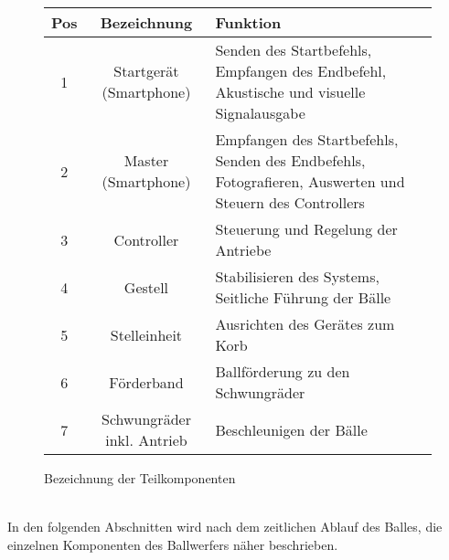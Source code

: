 \begin{figure}[h!]
	\begin{tabular}{|c|c|p{7.5cm}|}
		\hline \textbf{Pos} & \textbf{Bezeichnung} & \textbf{Funktion} \\ 
		\hline 1 & Startgerät (Smartphone) & Senden des Startbefehls, Empfangen des Endbefehl, Akustische und visuelle Signalausgabe
		\\ 
		\hline 2 & Master  (Smartphone) & Empfangen des Startbefehls, Senden des Endbefehls,
		Fotografieren, Auswerten und Steuern des Controllers
		\\ 
		\hline 3 & Controller & Steuerung und Regelung der Antriebe \\ 
		\hline 4 & Gestell & Stabilisieren des Systems,
		Seitliche Führung der Bälle
		\\ 
		\hline 5 & Stelleinheit & Ausrichten des Gerätes zum Korb \\ 
		\hline 6 & Förderband & Ballförderung zu den Schwungräder \\ 
		\hline 7 & Schwungräder inkl. Antrieb & Beschleunigen der Bälle \\ 
		\hline 
	\end{tabular} 
	\centering
	\caption{Bezeichnung der Teilkomponenten}	
	\label{tab:BezTeilkomponenten}
\end{figure}\\
In den folgenden Abschnitten wird nach dem zeitlichen Ablauf des Balles, die einzelnen Komponenten des Ballwerfers näher beschrieben. 